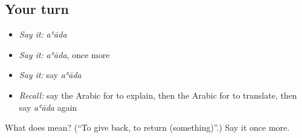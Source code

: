 \subsection*{Your turn}
\begin{itemize}
\raggedright
  \item \emph{Say it:} \emph{aʿāda}
  \item \emph{Say it:} \emph{aʿāda}, once more
  \item \emph{Say it:} say \emph{aʿāda}
  \item \emph{Recall:} say the Arabic for to explain, then the Arabic for to translate, then say \emph{aʿāda} again
\end{itemize}

\begin{tcolorbox}[breakable,colback=teal!4,colframe=teal!35!black,title={Before you move on}]
What does  mean? (\textquotedblleft{}To give back, to return (something)\textquotedblright{}.) Say it once more.
\end{tcolorbox}
